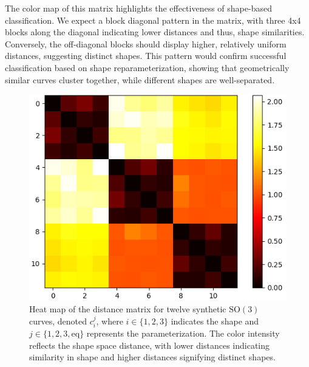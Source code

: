 The color map of this matrix highlights the effectiveness of shape-based classification. We expect a block diagonal pattern in the matrix, with three 4x4 blocks along the diagonal indicating lower distances and thus, shape similarities. Conversely, the off-diagonal blocks should display higher, relatively uniform distances, suggesting distinct shapes. This pattern would confirm successful classification based on shape reparameterization, showing that geometrically similar curves cluster together, while different shapes are well-separated. 

\begin{figure}
    \centering
    \includegraphics[width=0.7\linewidth]{figures/syntetic_data/distance_matrix/SO3.png}
    \caption[Classification using reparameterization of curves in \(\mathrm{SO}(3)\)]{Heat map of the distance matrix for twelve synthetic \(\mathrm{SO}(3)\) curves, denoted \(c_i^j\), where \(i \in \{1, 2, 3\}\) indicates the shape and \(j \in \{1, 2, 3, \text{eq}\}\) represents the parameterization. The color intensity reflects the shape space distance, with lower distances indicating similarity in shape and higher distances signifying distinct shapes.}
    \label{fig:classification-SO3}
\end{figure}

